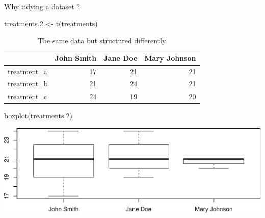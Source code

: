 \documentclass[14pt,ignorenonframetext,]{bredelebeamer}
\newenvironment{Shaded}{\begin{snugshade}}{\end{snugshade}}
\newcommand{\KeywordTok}[1]{\textcolor[rgb]{0.94,0.87,0.69}{#1}}
\newcommand{\DecValTok}[1]{\textcolor[rgb]{0.86,0.86,0.80}{#1}}
\newcommand{\StringTok}[1]{\textcolor[rgb]{0.80,0.58,0.58}{#1}}
\newcommand{\NormalTok}[1]{\textcolor[rgb]{0.80,0.80,0.80}{#1}}
\begin{document}
\begin{frame}[fragile]{Why tidying a dataset ?}

\begin{Shaded}
\begin{Highlighting}[]
\NormalTok{treatments.}\DecValTok{2}\NormalTok{ <-}\StringTok{ }\KeywordTok{t}\NormalTok{(treatments)}
\end{Highlighting}
\end{Shaded}

\begin{center}
\begin{table}[t]

\caption{\label{tab:unnamed-chunk-4}The same data but structured differently}
\centering
\begin{tabular}{l|r|r|r}
\hline
  & John Smith & Jane Doe & Mary Johnson\\
\hline
treatment\_a & 17 & 21 & 21\\
\hline
treatment\_b & 21 & 24 & 21\\
\hline
treatment\_c & 24 & 19 & 20\\
\hline
\end{tabular}
\end{table}
\end{center}

\begin{Shaded}
\begin{Highlighting}[]
\KeywordTok{boxplot}\NormalTok{(treatments.}\DecValTok{2}\NormalTok{)}
\end{Highlighting}
\end{Shaded}

\includegraphics{tidyverse_28_03_files/figure-beamer/boxplot2-1.pdf}

\end{frame}
\end{document}

